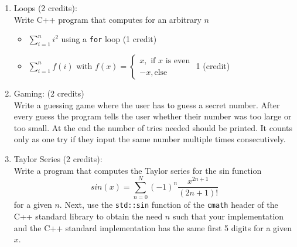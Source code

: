 \documentclass[11pt]{article}
\begin{document}
\begin{enumerate}

\item
Loops (2 credits): \\
Write C++ program that computes for an arbitrary $n$
\begin{itemize}
\item $\sum\limits_{i=1}^n i^2$ using a \lstinline|for| loop (1 credit)
\item $\sum\limits_{i=1}^n f(i)$ with $f(x) = \begin{cases} x, \text{ if } x \text{ is even} \\
-x, \text{else}   \end{cases}$ 1 (credit)
\end{itemize}


\item Gaming: (2 credits)\\
Write a guessing game where the user has to guess a secret number. After every guess the program tells the user whether their number was too large or too small. At the end the number of tries needed should be printed. It counts only as one try if they input the same number multiple times consecutively.

\item Taylor Series (2 credits): \\
Write a program that computes the Taylor series for the sin function
$$
sin(x) = \sum\limits_{n=0}^N (-1)^{n} \frac{x^{2n+1}}{(2n+1)!} 
$$
for a given $n$. Next, use the \lstinline|std::sin| function of the \lstinline|cmath| header of the C++ standard library to obtain the need $n$ such that your implementation and the C++ standard implementation has the same first 5 digits for a given $x$.



\end{enumerate}

\doclicenseThis 
\end{document}
